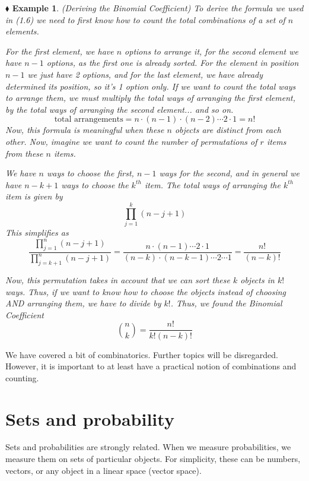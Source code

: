 \documentclass{report}
\newtheorem{example}{$\blacklozenge$ Example}[chapter]
\begin{document}
\begin{example}(Deriving the Binomial Coefficient)
    To derive the formula we used in (1.6) we need to first know how to count the total combinations of a set of
    $n$ elements.

    For the first element, we have $n$ options to arrange it, for the second element we have $n-1$ options, as the
    first one is already sorted. For the element in position $n-1$ we just have 2 options, and for the last element,
    we have already determined its position, so it's 1 option only. If we want to count the total ways to arrange
    them, we must multiply the total ways of arranging the first element, by the total ways of arranging the second
    element... and so on.
    \begin{equation}
        \text{total arrangements} = n\cdot(n-1)\cdot(n-2)\cdots 2 \cdot 1 = n!
    \end{equation}
    Now, this formula is meaningful when these $n$ objects are distinct from each other. Now, imagine we want to count
    the number of permutations of $r$ items from these $n$ items.

    We have $n$ ways to choose the first, $n-1$ ways for the second, and in general we have $n-k+1$ ways to choose the $k^{th}$
    item. The total ways of arranging the $k^{th}$ item is given by
    \begin{equation}
        \prod_{j=1}^{k}(n-j+1)
    \end{equation}
    This simplifies as
    \begin{equation}
        \frac{\prod_{j=1}^{n}{(n-j+1)}}{\prod_{j=k+1}^{n}{(n-j+1)}}=\frac{n\cdot(n-1)\cdots2\cdot1}{(n-k)\cdot(n-k-1)\cdots2\cdots1}=\frac{n!}{(n-k)!}
    \end{equation}

    Now, this permutation takes in account that we can sort these $k$ objects in $k!$ ways. Thus, if we want to know how to \textit{choose} the
    objects instead of choosing AND arranging them, we have to divide by $k!$. Thus, we found the Binomial Coefficient
    \begin{equation}
        \binom{n}{k} = \frac{n!}{k!(n-k)!}
    \end{equation}
\end{example}

We have covered a bit of combinatorics. Further topics will be disregarded. However, it is important to at least
have a practical notion of combinations and counting.

\section{Sets and probability}
Sets and probabilities are strongly related. When we measure probabilities, we measure them on sets of particular
objects. For simplicity, these can be numbers, vectors, or any object in a linear space (vector space).
\end{document}
